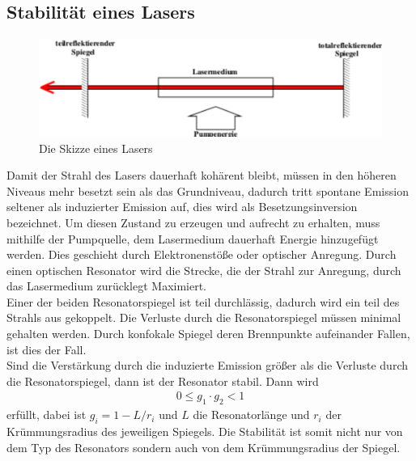 \subsection{Stabilität eines Lasers}
\begin{figure}[h!]
\centering
\includegraphics[scale=0.75]{../Grafiken/Laser.pdf}
\caption{Die Skizze eines Lasers\cite{V61}}\label{SkizzeLaser}
\end{figure}
Damit der Strahl des Lasers dauerhaft kohärent bleibt, müssen in den höheren Niveaus mehr besetzt sein als das Grundniveau, dadurch tritt spontane Emission seltener als induzierter Emission auf, dies wird als Besetzungsinversion bezeichnet. Um diesen Zustand zu erzeugen und aufrecht zu erhalten, muss mithilfe der Pumpquelle, dem Lasermedium dauerhaft Energie hinzugefügt werden. Dies geschieht durch Elektronenstöße oder optischer Anregung. Durch einen optischen Resonator wird die Strecke, die der Strahl zur Anregung, durch das Lasermedium zurücklegt Maximiert.\\
Einer der beiden Resonatorspiegel ist teil durchlässig, dadurch wird ein teil des Strahls aus gekoppelt. Die Verluste durch die Resonatorspiegel müssen minimal gehalten werden. Durch konfokale Spiegel deren Brennpunkte aufeinander Fallen, ist dies der Fall.\\
Sind die Verstärkung durch die induzierte Emission größer als die Verluste durch die Resonatorspiegel, dann ist der Resonator stabil. Dann wird
\begin{align}
0\le g_1\cdot g_2 < 1
\end{align}
erfüllt, dabei ist $g_i=1-L/r_i$ und $L$ die Resonatorlänge und $r_i$ der Krümmungsradius des jeweiligen Spiegels. Die Stabilität ist somit nicht nur von dem Typ des Resonators sondern auch von dem Krümmungsradius der Spiegel.
